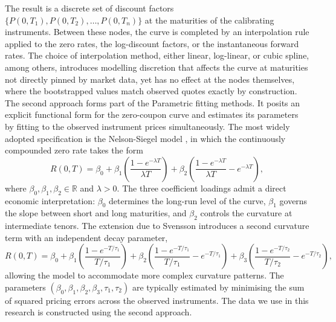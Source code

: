         \noindent
        The result is a discrete set of discount factors $\{P(0, T_1), P(0, T_2), \ldots, P(0, T_n)\}$ at the maturities of the calibrating instruments. Between these nodes, the curve is completed by an interpolation rule applied to the zero rates, the log-discount factors, or the instantaneous forward rates. The choice of interpolation method, either linear, log-linear, or cubic spline, among others, introduces modelling discretion that affects the curve at maturities not directly pinned by market data, yet has no effect at the nodes themselves, where the bootstrapped values match observed quotes exactly by construction.\\
        
        \noindent
        The second approach forms part of the Parametric fitting methods. It posits an explicit functional form for the zero-coupon curve and estimates its parameters by fitting to the observed instrument prices simultaneously. The most widely adopted specification is the Nelson-Siegel model \cite{NelsonSiegel1987}, in which the continuously compounded zero rate takes the form
          \begin{equation} \label{eq:nelson_siegel}
            R(0,T) = \beta_0 + \beta_1 \left(\frac{1 - e^{-\lambda T}}{\lambda T}\right) + \beta_2 \left(\frac{1 - e^{-\lambda T}}{\lambda T} - e^{-\lambda T}\right),
          \end{equation}
          where $\beta_0, \beta_1, \beta_2 \in \mathbb{R}$ and $\lambda > 0$. The three coefficient loadings admit a direct economic interpretation: $\beta_0$ determines the long-run level of
        the curve, $\beta_1$ governs the slope between short and long maturities, and $\beta_2$ controls the curvature at intermediate tenors. The extension due to Svensson \cite{Svensson1994}
        introduces a second curvature term with an independent decay parameter,
          \begin{equation} \label{eq:svensson}
            R(0,T) = \beta_0 + \beta_1 \left(\frac{1 - e^{-T/\tau_1}}{T/\tau_1}\right) + \beta_2 \left(\frac{1 - e^{-T/\tau_1}}{T/\tau_1} - e^{-T/\tau_1}\right) + \beta_3 \left(\frac{1 -
        e^{-T/\tau_2}}{T/\tau_2} - e^{-T/\tau_2}\right),
          \end{equation}
        allowing the model to accommodate more complex curvature patterns. The parameters $(\beta_0, \beta_1, \beta_2, \beta_3, \tau_1, \tau_2)$ are typically estimated by minimising the sum of squared pricing errors across the observed instruments. The data we use in this research is constructed using the second approach.  \\




